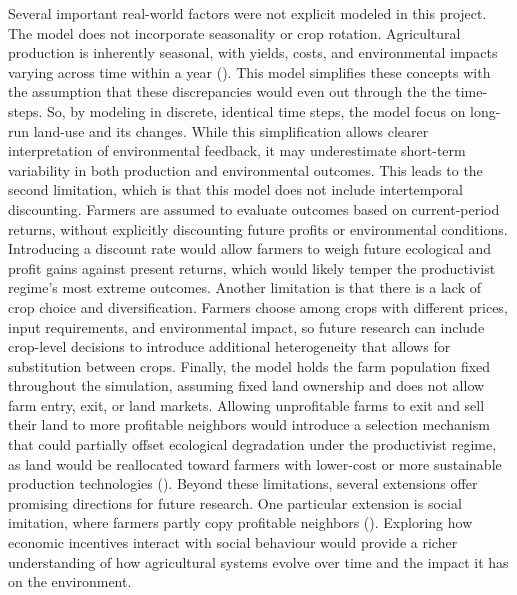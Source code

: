 \documentclass{article}
\begin{document}
Several important real-world factors were not explicit modeled in this project. The model does not incorporate seasonality or crop rotation. Agricultural production is inherently seasonal, with yields, costs, and environmental impacts varying across time within a year (\cite{chambers1987seasons}). This model simplifies these concepts with the assumption that these discrepancies would even out through the the time-steps. So, by modeling in discrete, identical time steps, the model focus on long-run land-use and its changes. While this simplification allows clearer interpretation of environmental feedback, it may underestimate short-term variability in both production and environmental outcomes. This leads to the second limitation, which is that this model does not include intertemporal discounting. Farmers are assumed to evaluate outcomes based on current-period returns, without explicitly discounting future profits or environmental conditions. Introducing a discount rate would allow farmers to weigh future ecological and profit gains against present returns, which would likely temper the productivist regime's most extreme outcomes. Another limitation is that there is a lack of crop choice and diversification. Farmers choose among crops with different prices, input requirements, and environmental impact, so future research can include crop-level decisions to introduce additional heterogeneity that allows for substitution between crops. Finally, the model holds the farm population fixed throughout the simulation, assuming fixed land ownership and does not allow farm entry, exit, or land markets. Allowing unprofitable farms to exit and sell their land to more profitable neighbors would introduce a selection mechanism that could partially offset ecological degradation under the productivist regime, as land would be reallocated toward farmers with lower-cost or more sustainable production technologies (\cite{shen2025alc}). Beyond these limitations, several extensions offer promising directions for future research. One particular extension is social imitation, where farmers partly copy profitable neighbors (\cite{apetrei2024social}). Exploring how economic incentives interact with social behaviour would provide a richer understanding of how agricultural systems evolve over time and the impact it has on the environment. 

\newpage
\printbibliography
\end{document}
